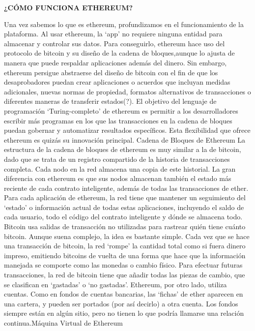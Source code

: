 


\textbf{¿CÓMO FUNCIONA ETHEREUM?\\}


Una vez sabemos lo que es ethereum, profundizamos en el funcionamiento de la plataforma.
Al usar ethereum, la ‘app’ no requiere ninguna entidad para almacenar y controlar sus datos. Para conseguirlo, ethereum hace uso del protocolo de bitcoin y su diseño de la cadena de bloques,aunque lo ajusta de manera que puede respaldar aplicaciones además del dinero.
Sin embargo, ethereum persigue abstraerse del diseño de bitcoin con el fin de que los
desaprobadores puedan crear aplicaciones o acuerdos que incluyan medidas adicionales, nuevas
normas de propiedad, formatos alternativos de transacciones o diferentes maneras de transferir
estados(?).
El objetivo del lenguaje de programación ‘Turing-completo’ de ethereum es permitir a los
desarrolladores escribir más programas en los que las transacciones en la cadena de bloques
puedan gobernar y automatizar resultados específicos. Esta flexibilidad que ofrece ethereum es
quizás su innovación principal.
Cadena de Bloques de Ethereum
La estructura de la cadena de bloques de ethereum es muy similar a la de bitcoin, dado que se
trata de un registro compartido de la historia de transacciones completa. Cada nodo en la red
almacena una copia de este historial.
La gran diferencia con ethereum es que sus nodos almacenan también el estado más reciente de
cada contrato inteligente, además de todas las transacciones de ether.
Para cada aplicación de ethereum, la red tiene que mantener un seguimiento del ‘estado’ o
información actual de todas estas aplicaciones, incluyendo el saldo de cada usuario, todo el
código del contrato inteligente y dónde se almacena todo.
Bitcoin usa salidas de transacción no utilizadas para rastrear quién tiene cuánto bitcoin.
Aunque suena complejo, la idea es bastante simple. Cada vez que se hace una transacción de
bitcoin, la red ‘rompe’ la cantidad total como si fuera dinero impreso, emitiendo bitcoins de vuelta
de una forma que hace que la información manejada se comporte como las monedas o cambio
físico.
Para efectuar futuras transacciones, la red de bitcoin tiene que añadir todas las piezas de cambio,
que se clasifican en ‘gastadas’ o ‘no gastadas’.
Ethereum, por otro lado, utiliza cuentas.
Como en fondos de cuentas bancarias, las ‘fichas’ de ether aparecen en una cartera, y pueden ser
portados (por así decirlo) a otra cuenta. Los fondos siempre están en algún sitio, pero no tienen lo
que podría llamarse una relación continua.Máquina Virtual de Ethereum
